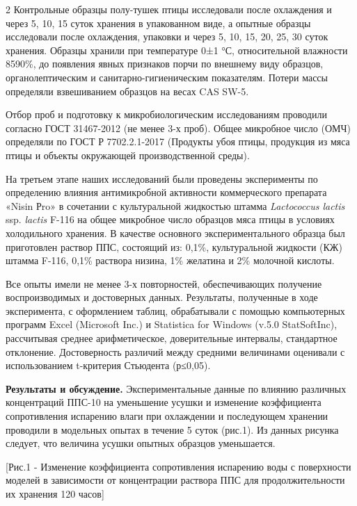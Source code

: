 \begin{multicols}{2}
Контрольные образцы полу-тушек птицы исследовали после охлаждения и
через 5, 10, 15 суток хранения в упакованном виде, а опытные образцы
исследовали после охлаждения, упаковки и через 5, 10, 15, 20, 25, 30
суток хранения. Образцы хранили при температуре 0±1 °С, относительной
влажности 8590\%, до появления явных признаков порчи по внешнему виду
образцов, органолептическим и санитарно-гигиеническим показателям.
Потери массы определяли взвешиванием образцов на весах CAS SW-5.

Отбор проб и подготовку к микробиологическим исследованиям проводили
согласно ГОСТ 31467-2012 (не менее 3-х проб). Общее микробное число
(ОМЧ) определяли по ГОСТ Р 7702.2.1-2017 (Продукты убоя птицы, продукция
из мяса птицы и объекты окружающей производственной среды).

На третьем этапе наших исследований были проведены эксперименты по
определению влияния антимикробной активности коммерческого препарата
«Nisin Рro» в сочетании с культуральной жидкостью штамма
\emph{Lactococcus lactis} ssp. \emph{lactis} F-116 на общее микробное
число образцов мяса птицы в условиях холодильного хранения. В качестве
основного экспериментального образца был приготовлен раствор ППС,
состоящий из: 0,1\%, культуральной жидкости (КЖ) штамма F-116, 0,1\%
раствора низина, 1\% желатина и 2\% молочной кислоты.

Все опыты имели не менее 3-х повторностей, обеспечивающих получение
воспроизводимых и достоверных данных. Результаты, полученные в ходе
эксперимента, с оформлением таблиц, обрабатывали с помощью компьютерных
программ Excel (Microsoft Inc.) и Statistica for Windows (v.5.0
StatSoftInc), рассчитывая среднее арифметическое, доверительные
интервалы, стандартное отклонение. Достоверность различий между средними
величинами оценивали с использованием t-критерия Стьюдента (р≤0,05).

{\bfseries Результаты и обсуждение.} Экспериментальные данные по влиянию
различных концентраций ППС-10 на уменьшение усушки и изменение
коэффициента сопротивления испа­рению влаги при охлаждении и по­следующем
хранении проводили в модельных опытах в течение 5 суток (рис.1). Из
данных рисунка следует, что величина усушки опытных образцов
уменьшается.
\end{multicols}

[Рис.1 - Изменение коэффициента
сопротивления испарению воды с поверхности моделей в зависимости от
концентрации раствора ППС для продолжительности их хранения 120 часов]

